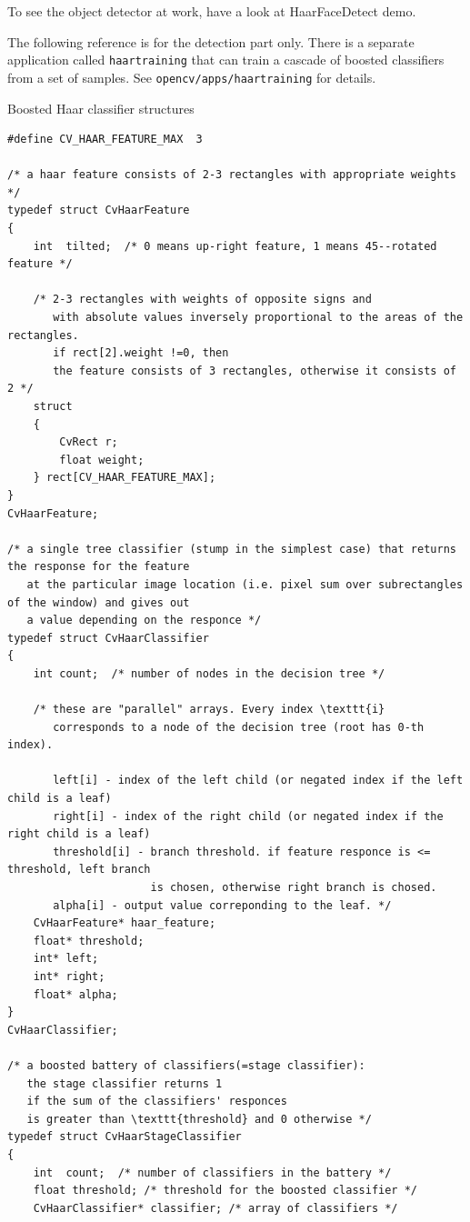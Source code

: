 To see the object detector at work, have a look at HaarFaceDetect demo.

The following reference is for the detection part only. There
is a separate application called \texttt{haartraining} that can
train a cascade of boosted classifiers from a set of samples. See
\texttt{opencv/apps/haartraining} for details.

\label{CvHaarFeature}
\label{CvHaarClassifier}
\label{CvHaarStageClassifier}
\label{CvHaarClassifierCascade}

Boosted Haar classifier structures

\begin{lstlisting}
#define CV_HAAR_FEATURE_MAX  3

/* a haar feature consists of 2-3 rectangles with appropriate weights */
typedef struct CvHaarFeature
{
    int  tilted;  /* 0 means up-right feature, 1 means 45--rotated feature */

    /* 2-3 rectangles with weights of opposite signs and
       with absolute values inversely proportional to the areas of the rectangles.
       if rect[2].weight !=0, then
       the feature consists of 3 rectangles, otherwise it consists of 2 */
    struct
    {
        CvRect r;
        float weight;
    } rect[CV_HAAR_FEATURE_MAX];
}
CvHaarFeature;

/* a single tree classifier (stump in the simplest case) that returns the response for the feature
   at the particular image location (i.e. pixel sum over subrectangles of the window) and gives out
   a value depending on the responce */
typedef struct CvHaarClassifier
{
    int count;  /* number of nodes in the decision tree */

    /* these are "parallel" arrays. Every index \texttt{i}
       corresponds to a node of the decision tree (root has 0-th index).

       left[i] - index of the left child (or negated index if the left child is a leaf)
       right[i] - index of the right child (or negated index if the right child is a leaf)
       threshold[i] - branch threshold. if feature responce is <= threshold, left branch
                      is chosen, otherwise right branch is chosed.
       alpha[i] - output value correponding to the leaf. */
    CvHaarFeature* haar_feature;
    float* threshold;
    int* left;
    int* right;
    float* alpha;
}
CvHaarClassifier;

/* a boosted battery of classifiers(=stage classifier):
   the stage classifier returns 1
   if the sum of the classifiers' responces
   is greater than \texttt{threshold} and 0 otherwise */
typedef struct CvHaarStageClassifier
{
    int  count;  /* number of classifiers in the battery */
    float threshold; /* threshold for the boosted classifier */
    CvHaarClassifier* classifier; /* array of classifiers */


\end{lstlisting}
